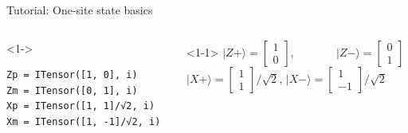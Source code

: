 \begin{frame}[fragile]{Tutorial: One-site state basics}

\begin{columns}

\begin{column}[T]{0.45\textwidth}
\begin{onlyenv}<1->
\begin{lstlisting}[language=JuliaLocal, style=julia, basicstyle=\small]
Zp = ITensor([1, 0], i)
Zm = ITensor([0, 1], i)
Xp = ITensor([1, 1]/√2, i) 
Xm = ITensor([1, -1]/√2, i) 
\end{lstlisting}
\end{onlyenv}
\end{column}

\begin{column}[T]{0.6\textwidth}
\begin{onlyenv}<1-1>
$|Z+\rangle = \begin{bmatrix} 1 \\ 0 \end{bmatrix}$,
\ \ \ \ \ \ \  $|Z-\rangle = \begin{bmatrix} 0 \\ 1 \end{bmatrix}$ \\
$|X+\rangle = \begin{bmatrix} 1 \\ 1 \end{bmatrix}/\sqrt{2}$,
  $|X-\rangle = \begin{bmatrix} 1 \\ -1 \end{bmatrix}/\sqrt{2}$
\end{onlyenv}


\end{column}
\end{columns}
\end{frame}
